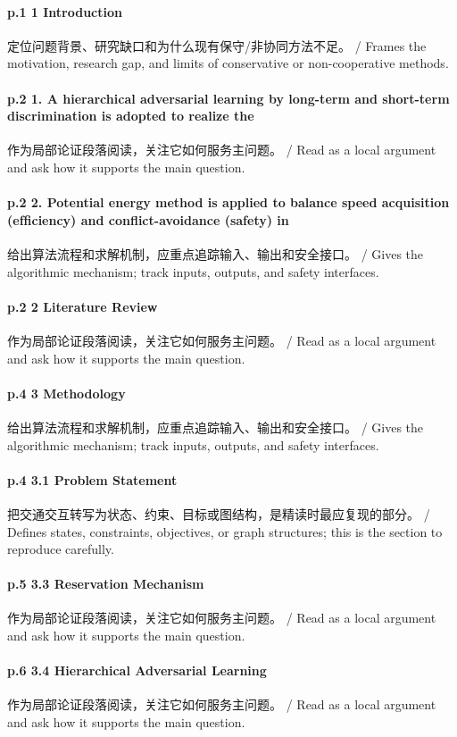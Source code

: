 \documentclass[UTF8,a4paper,11pt,fontset=fandol]{ctexart}
\begin{document}
\paragraph{p.1 1 Introduction}定位问题背景、研究缺口和为什么现有保守/非协同方法不足。 / Frames the motivation, research gap, and limits of conservative or non-cooperative methods.

\paragraph{p.2 1. A hierarchical adversarial learning by long-term and short-term discrimination is adopted to realize the}作为局部论证段落阅读，关注它如何服务主问题。 / Read as a local argument and ask how it supports the main question.

\paragraph{p.2 2. Potential energy method is applied to balance speed acquisition (efﬁciency) and conﬂict-avoidance (safety) in}给出算法流程和求解机制，应重点追踪输入、输出和安全接口。 / Gives the algorithmic mechanism; track inputs, outputs, and safety interfaces.

\paragraph{p.2 2 Literature Review}作为局部论证段落阅读，关注它如何服务主问题。 / Read as a local argument and ask how it supports the main question.

\paragraph{p.4 3 Methodology}给出算法流程和求解机制，应重点追踪输入、输出和安全接口。 / Gives the algorithmic mechanism; track inputs, outputs, and safety interfaces.

\paragraph{p.4 3.1 Problem Statement}把交通交互转写为状态、约束、目标或图结构，是精读时最应复现的部分。 / Defines states, constraints, objectives, or graph structures; this is the section to reproduce carefully.

\paragraph{p.5 3.3 Reservation Mechanism}作为局部论证段落阅读，关注它如何服务主问题。 / Read as a local argument and ask how it supports the main question.

\paragraph{p.6 3.4 Hierarchical Adversarial Learning}作为局部论证段落阅读，关注它如何服务主问题。 / Read as a local argument and ask how it supports the main question.
\end{document}
